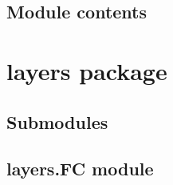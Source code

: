 \documentclass[letterpaper,10pt,english,openany,oneside]{sphinxmanual}
\begin{document}
\subsection{Module contents}
\label{\detokenize{_modules/controllers:module-controllers}}\label{\detokenize{_modules/controllers:module-contents}}

\section{layers package}
\label{\detokenize{_modules/layers:layers-package}}\label{\detokenize{_modules/layers::doc}}

\subsection{Submodules}
\label{\detokenize{_modules/layers:submodules}}

\subsection{layers.FC module}
\label{\detokenize{_modules/layers:module-layers.FC}}\label{\detokenize{_modules/layers:layers-fc-module}}
\end{document}
